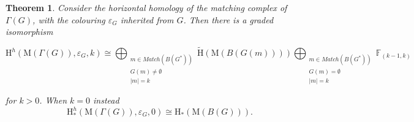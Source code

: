 \documentclass[11pt, a4paper, reqno, twoside, makeidx]{amsart}
\theoremstyle{remark}
\theoremstyle{plain}
\newtheorem{thm}{Theorem}[section]
\theoremstyle{definition}
\newcommand{\F}{\mathbb{F}}
\newcommand{\HH}{\mathrm{H}}
\newcommand{\Mat}{\mathrm{M}}
\begin{document}
\begin{thm}\label{thm:horizhomoftait}
Consider the horizontal homology of the matching complex of $\Gamma(G)$, with the colouring $\varepsilon_G$ inherited from $G$. Then there is a graded isomorphism

\begin{equation}\label{eqn:horizgraphs}
\HH^h(\Mat (\Gamma(G)), \varepsilon_G, k) \cong 
\bigoplus_{\substack{m \in Match(B(G^*)) \\ G(m) \neq \emptyset\\|m| = k}} \widetilde{\HH}(\Mat (B(G(m))))  \bigoplus_{\substack{m \in Match(B(G^*)) \\ G(m) = \emptyset\\|m| = k}} \F_{(k-1,k)}
\end{equation}

for $k >0$. When $k=0$ instead  $$\HH^h_*(\Mat (\Gamma(G)), \varepsilon_G, 0) \cong \HH_*(\Mat (B(G))).$$
\end{thm}
\end{document}
